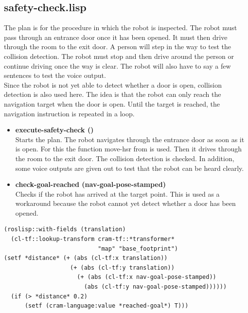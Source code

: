 \documentclass[main.tex]{subfiles}
\begin{document}
	    \subsection{safety-check.lisp}
	    The plan is for the procedure in which the robot is inspected. The robot must pass through an entrance door once it has been opened. It must then drive through the room to the exit door. A person will step in the way to test the collision detection.  The robot must stop and then drive around the person or continue driving once the way is clear. The robot will also have to say a few sentences to test the voice output. \\
			Since the robot is not yet able to detect whether a door is open, collision detection is also used here. The idea is that the robot can only reach the navigation target when the door is open. Until the target is reached, the navigation instruction is repeated in a loop.
	    \begin{itemize}
	    	\item \textbf{execute-safety-check ()} \\
	    	Starts the plan. The robot navigates through the entrance door as soon as it is open. For this the function move-hsr from  is used. Then it drives through the room to the exit door. The collision detection is checked. In addition, some voice outputs are given out to test that the robot can be heard clearly.
	    	\item \textbf{check-goal-reached (nav-goal-pose-stamped)}\\
	    	Checks if the robot has arrived at the target point. This is used as a workaround because the robot cannot yet detect whether a door has been opened.
	    \end{itemize}
			\begin{lstlisting}[language={elisp}]
(roslisp::with-fields (translation) 
  (cl-tf::lookup-transform cram-tf::*transformer* 
                           "map" "base_footprint")
(setf *distance* (+ (abs (cl-tf:x translation))
                   (+ (abs (cl-tf:y translation))
                     (+ (abs (cl-tf:x nav-goal-pose-stamped))
                       (abs (cl-tf:y nav-goal-pose-stamped))))))
  (if (> *distance* 0.2) 
      (setf (cram-language:value *reached-goal*) T)))
		  \end{lstlisting}
\end{document}
